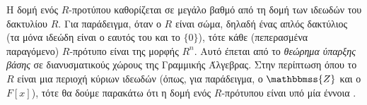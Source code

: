 \documentclass[12pt,a4paper,reqno]{amsart}
\theoremstyle{definition}
\theoremstyle{remark}
\numberwithin{theorem}{section}
\numberwithin{exercise}{section}
\numberwithin{equation}{section}
\newcommand{\ZZ}{\mathbbmss{Z}}
\begin{document}
Η δομή ενός $R$-προτύπου καθορίζεται σε μεγάλο βαθμό από τη δομή των ιδεωδών του δακτυλίου $R$. Για παράδειγμα, όταν ο $R$ είναι σώμα, δηλαδή ένας απλός δακτύλιος (τα μόνα ιδεώδη είναι ο εαυτός του και το $\{0\}$), τότε κάθε (πεπερασμένα παραγόμενο) $R$-πρότυπο είναι της μορφής $R^n$. Αυτό έπεται από το \emph{θεώρημα ύπαρξης βάσης} σε διανυσματικούς χώρους της Γραμμικής Άλγεβρας. Στην περίπτωση όπου το $R$ είναι μια περιοχή κύριων ιδεωδών (όπως, για παράδειγμα, ο $\ZZ$ και ο $F[x]$), τότε θα δούμε παρακάτω ότι η δομή ενός $R$-πρότυπου είναι υπό μία έννοια . 

\end{document}
